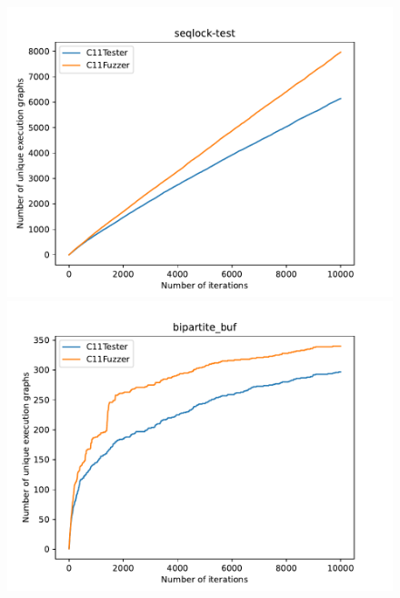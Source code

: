 \begin{figure}[H]
    \begin{minipage}{0.45\textwidth}
        \centering
        \includegraphics[width=\textwidth]{figure/seqlock-test.pdf}
    \end{minipage}
    \hfill
    \begin{minipage}{0.45\textwidth}
        \centering
        \includegraphics[width=\textwidth]{figure/bipartite_buf.pdf}
    \end{minipage}

    \vspace{0.5cm}


\end{figure}
